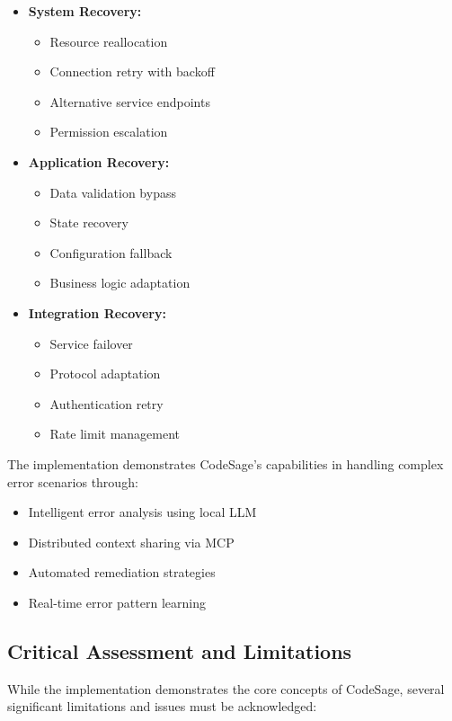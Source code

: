 \begin{itemize}
    \item \textbf{System Recovery:}
    \begin{itemize}
        \item Resource reallocation
        \item Connection retry with backoff
        \item Alternative service endpoints
        \item Permission escalation
    \end{itemize}
    
    \item \textbf{Application Recovery:}
    \begin{itemize}
        \item Data validation bypass
        \item State recovery
        \item Configuration fallback
        \item Business logic adaptation
    \end{itemize}
    
    \item \textbf{Integration Recovery:}
    \begin{itemize}
        \item Service failover
        \item Protocol adaptation
        \item Authentication retry
        \item Rate limit management
    \end{itemize}
\end{itemize}

The implementation demonstrates CodeSage's capabilities in handling complex error scenarios through:

\begin{itemize}
    \item Intelligent error analysis using local LLM
    \item Distributed context sharing via MCP
    \item Automated remediation strategies
    \item Real-time error pattern learning
\end{itemize}

\subsection{Critical Assessment and Limitations}
While the implementation demonstrates the core concepts of CodeSage, several significant limitations and issues must be acknowledged:

